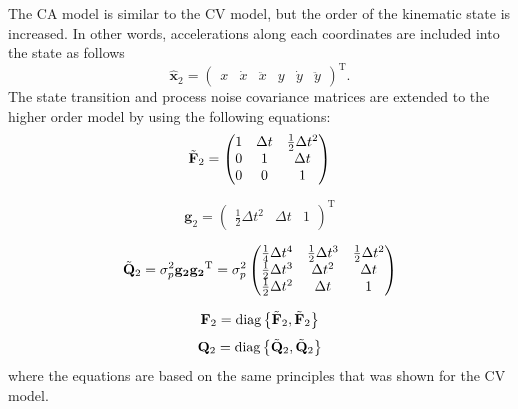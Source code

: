 \documentclass[english, 12pt, a4paper, elec, utf8, a-1b, online]{aaltothesis}
\renewcommand{\vec}[1]{\mathbf{#1}}
\newcommand{\transpose}[1]{#1^\text{T}}
\newcommand{\dt}{\Delta t}
\newcommand{\diag}[1]{\text{diag}\left\{ #1 \right\}}
\begin{document}
The CA model is similar to the CV model, but the order of the kinematic state is increased.
In other words, accelerations along each coordinates are included into the state as follows  
\begin{equation}\label{eq:x_mode2}
    \hat{\mathbf{x}}_2 =
        \transpose{
        \begin{pmatrix}
            x & \dot{x} & \ddot{x} & y & \dot{y} & \ddot{y}
        \end{pmatrix}}.
\end{equation}
The state transition and process noise covariance matrices are extended to the higher order model by using the following equations:  
\begin{equation}\label{eq:f_mode2}
    \Tilde{\vec{F}}_2 = 
    \begin{pmatrix}
        1 & \dt & \frac{1}{2}\dt^2  \\ 
        0 & 1 & \dt \\
        0 & 0 & 1  \\
    \end{pmatrix}
\end{equation}

\begin{equation}
    \vec{g}_2 = \transpose{
        \begin{pmatrix}
            \frac{1}{2} \dt^2 & \dt & 1
        \end{pmatrix}
    }
\end{equation}

\begin{equation}
    \Tilde{\vec{Q}}_2 = \sigma_p^2 \vec{g_2} \transpose{\vec{g_2}}  =  \sigma_p^2
        \begin{pmatrix}
            \frac{1}{4} \dt^4 & \frac{1}{2} \dt^3 & \frac{1}{2} \dt^2 \\ 
            \frac{1}{2} \dt^3 & \dt^2 &  \dt \\
            \frac{1}{2} \dt^2 & \dt & 1
        \end{pmatrix}
\end{equation}

\begin{equation}\label{eq:F_mode2}
\vec{F}_2 = \diag{\Tilde{\vec{F}}_2, \Tilde{\vec{F}}_2}
\end{equation}
\begin{equation}
    \vec{Q}_2 = \diag{\Tilde{\vec{Q}}_2, \Tilde{\vec{Q}}_2}
\end{equation}
where the equations are based on the same principles that was shown for the CV model.
\end{document}
